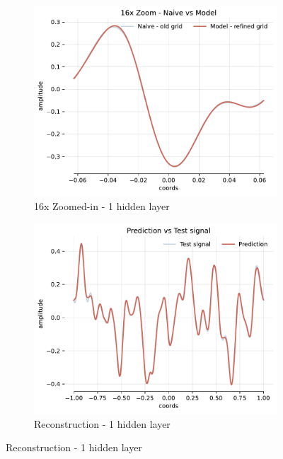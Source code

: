 \begin{figure}[!h]
\begin{subfigure}[b]{0.32\textwidth}
    \end{subfigure}
    \begin{subfigure}[b]{0.32\textwidth}
        \centering
        \includegraphics[width=\textwidth]{img/ch3/16x-32hf-1hl-6w-sub4.pdf}
        \caption{16x Zoomed-in - 1 hidden layer}
    \end{subfigure}
    \begin{subfigure}[b]{0.32\textwidth}
        \centering
        \includegraphics[width=\textwidth]{img/ch3/pred-24hf-1hl-6w-sub5.pdf}
        \caption{Reconstruction - 1 hidden layer}
    \end{subfigure}

\end{figure}

